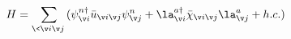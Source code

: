 \begin{equation}
 H = 
\sum_{\<\v i\v j\>}  (
\psi^{n \dag}_{\v i} \bar u_{\v i\v j} \psi^{n}_{\v j}
+\la^{a \dag}_{\v i} \bar \chi_{\v i\v j} \la^{a}_{\v j}
+h.c. )
\end{equation}

